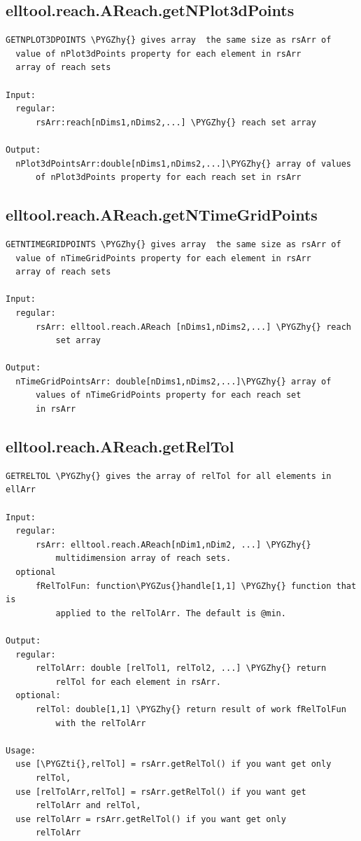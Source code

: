 \documentclass[letterpaper,10pt,english]{sphinxmanual}
\def\PYGZus{\char`\_}
\def\PYGZhy{\char`\-}
\def\PYGZti{\char`\~}
\begin{document}
\subsection{elltool.reach.AReach.getNPlot3dPoints}
\label{chap_functions:elltool-reach-areach-getnplot3dpoints}
\begin{Verbatim}[commandchars=\\\{\}]
GETNPLOT3DPOINTS \PYGZhy{} gives array  the same size as rsArr of
  value of nPlot3dPoints property for each element in rsArr
  array of reach sets

Input:
  regular:
      rsArr:reach[nDims1,nDims2,...] \PYGZhy{} reach set array

Output:
  nPlot3dPointsArr:double[nDims1,nDims2,...]\PYGZhy{} array of values
      of nPlot3dPoints property for each reach set in rsArr
\end{Verbatim}


\subsection{elltool.reach.AReach.getNTimeGridPoints}
\label{chap_functions:elltool-reach-areach-getntimegridpoints}
\begin{Verbatim}[commandchars=\\\{\}]
GETNTIMEGRIDPOINTS \PYGZhy{} gives array  the same size as rsArr of
  value of nTimeGridPoints property for each element in rsArr
  array of reach sets

Input:
  regular:
      rsArr: elltool.reach.AReach [nDims1,nDims2,...] \PYGZhy{} reach
          set array

Output:
  nTimeGridPointsArr: double[nDims1,nDims2,...]\PYGZhy{} array of
      values of nTimeGridPoints property for each reach set
      in rsArr
\end{Verbatim}


\subsection{elltool.reach.AReach.getRelTol}
\label{chap_functions:elltool-reach-areach-getreltol}
\begin{Verbatim}[commandchars=\\\{\}]
GETRELTOL \PYGZhy{} gives the array of relTol for all elements in
ellArr

Input:
  regular:
      rsArr: elltool.reach.AReach[nDim1,nDim2, ...] \PYGZhy{}
          multidimension array of reach sets.
  optional
      fRelTolFun: function\PYGZus{}handle[1,1] \PYGZhy{} function that is
          applied to the relTolArr. The default is @min.

Output:
  regular:
      relTolArr: double [relTol1, relTol2, ...] \PYGZhy{} return
          relTol for each element in rsArr.
  optional:
      relTol: double[1,1] \PYGZhy{} return result of work fRelTolFun
          with the relTolArr

Usage:
  use [\PYGZti{},relTol] = rsArr.getRelTol() if you want get only
      relTol,
  use [relTolArr,relTol] = rsArr.getRelTol() if you want get
      relTolArr and relTol,
  use relTolArr = rsArr.getRelTol() if you want get only
      relTolArr
\end{Verbatim}
\end{document}
